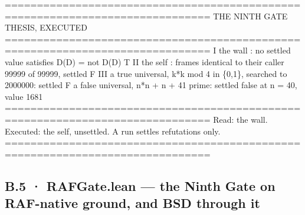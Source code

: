 \documentclass[10pt,twocolumn]{article}
\newenvironment{Shaded}{}{}
\newcommand{\AttributeTok}[1]{#1}
\newcommand{\DecValTok}[1]{#1}
\newcommand{\FunctionTok}[1]{#1}
\newcommand{\KeywordTok}[1]{#1}
\newcommand{\NormalTok}[1]{#1}
\newcommand{\OperatorTok}[1]{#1}
\providecommand{\AttributeTok}[1]{#1}
\providecommand{\DecValTok}[1]{#1}
\providecommand{\FunctionTok}[1]{#1}
\providecommand{\KeywordTok}[1]{#1}
\providecommand{\NormalTok}[1]{#1}
\providecommand{\OperatorTok}[1]{#1}
\providecommand{\AttributeTok}[1]{#1}
\providecommand{\DecValTok}[1]{#1}
\providecommand{\FunctionTok}[1]{#1}
\providecommand{\KeywordTok}[1]{#1}
\providecommand{\NormalTok}[1]{#1}
\providecommand{\OperatorTok}[1]{#1}
\begin{document}
\begin{strip}
\begin{Shaded}
\begin{Highlighting}[]
\OperatorTok{==============================================================================}
\NormalTok{ THE NINTH GATE THESIS}\OperatorTok{,}\NormalTok{ EXECUTED}
\OperatorTok{==============================================================================}
\NormalTok{ I   the wall }\OperatorTok{:}\NormalTok{ no settled value satisfies }\FunctionTok{D}\NormalTok{(D) }\OperatorTok{=}\NormalTok{ not }\FunctionTok{D}\NormalTok{(D)           T}
\NormalTok{ II  the self }\OperatorTok{:}\NormalTok{ frames identical to their caller }\DecValTok{99999} \KeywordTok{of} \DecValTok{99999}\OperatorTok{,}\NormalTok{ settled F}
\NormalTok{ III a }\KeywordTok{true}\NormalTok{ universal}\OperatorTok{,}\NormalTok{ k}\OperatorTok{*}\NormalTok{k mod }\DecValTok{4} \KeywordTok{in}\NormalTok{ \{}\DecValTok{0}\OperatorTok{,}\DecValTok{1}\NormalTok{\}}\OperatorTok{,}\NormalTok{ searched to }\DecValTok{2000000}\OperatorTok{:}\NormalTok{ settled F}
\NormalTok{     a }\KeywordTok{false}\NormalTok{ universal}\OperatorTok{,}\NormalTok{ n}\OperatorTok{*}\NormalTok{n }\OperatorTok{+}\NormalTok{ n }\OperatorTok{+} \DecValTok{41}\NormalTok{ prime}\OperatorTok{:}\NormalTok{ settled }\KeywordTok{false}\NormalTok{ at n }\OperatorTok{=} \DecValTok{40}\OperatorTok{,}\NormalTok{ value }\DecValTok{1681}
\OperatorTok{==============================================================================}
\NormalTok{ Read}\OperatorTok{:}\NormalTok{ the wall}\OperatorTok{.} \AttributeTok{Executed}\OperatorTok{:}\NormalTok{ the self}\OperatorTok{,}\NormalTok{ unsettled}\OperatorTok{.} \AttributeTok{A}\NormalTok{ run settles refutations only}\OperatorTok{.}
\OperatorTok{==============================================================================}
\end{Highlighting}
\end{Shaded}
\end{strip}

\subsection{B.5 · RAFGate.lean --- the Ninth Gate on RAF-native ground,
and BSD through
it}\label{b.5-rafgate.lean-the-ninth-gate-on-raf-native-ground-and-bsd-through-it}
\end{document}
